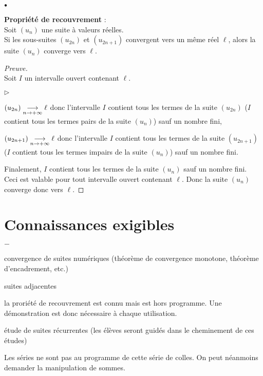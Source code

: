 \documentclass[11pt]{article}%
\begin{document}
\begin{noliste}{$\scriptstyle \bullet$}
   \item {\bf Propriété de recouvrement} :\\
   Soit $\left( u_n \right)$ une suite à valeurs réelles.\\ 
   Si les 
   sous-suites $\left(u_{2n} \right)$ et $\left( u_{2n+1} \right)$ 
   convergent vers un même réel $\ell$, alors la suite $\left( u_n 
   \right)$ converge vers $\ell$.
   \begin{proof}[Preuve]~\\
    Soit $I$ un intervalle ouvert contenant $\ell$.
    \begin{noliste}{$\triangleright$}
    \item $(u_{2n}) \underset{n\to +\infty}{\longrightarrow} \ell$ donc l'intervalle $I$ contient 
    tous les termes de la suite $(u_{2n})$ (\ie $I$ 
    contient tous les termes pairs de la suite $(u_{n})$) sauf un 
    nombre fini,
    \item $(u_{2n+1}) \underset{n\to +\infty}{\longrightarrow} \ell$ donc l'intervalle $I$ contient 
    tous les termes de la suite $(u_{2n+1})$ (\ie $I$ 
    contient tous les termes impairs de la suite $(u_{n})$) sauf un 
    nombre fini.
    \end{noliste}
    Finalement, $I$ contient tous les termes de la suite $\left( u_n 
    \right)$ sauf un nombre fini.\\
    Ceci est valable pour tout intervalle ouvert contenant $\ell$. 
    Donc la suite $\left( u_n \right)$ 
    converge donc vers $\ell$.
    \end{proof}
\end{noliste}


\section*{Connaissances exigibles}

\begin{noliste}{$-$}
\item convergence de suites numériques (théorème de convergence 
monotone, théorème d'encadrement, etc.)
\item suites adjacentes
\item la proriété de recouvrement est connu mais est hors programme. 
Une démonstration est donc nécessaire à chaque utilisation.
\item étude de suites récurrentes (les élèves seront guidés dans 
le cheminement de ces études)
\item Les séries ne sont pas au programme de cette série de colles. On 
peut néanmoins demander la manipulation de sommes.
\end{noliste}
\end{document}
